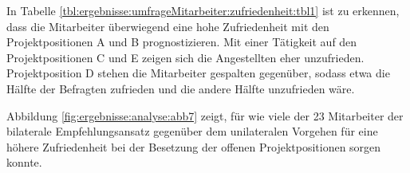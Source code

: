 In Tabelle \ref{tbl:ergebnisse:umfrageMitarbeiter:zufriedenheit:tbl1} ist zu erkennen, dass die Mitarbeiter überwiegend eine hohe Zufriedenheit mit den Projektpositionen A und B prognostizieren. Mit einer Tätigkeit auf den Projektpositionen C und E zeigen sich die Angestellten eher unzufrieden. Projektposition D stehen die Mitarbeiter gespalten gegenüber, sodass etwa die Hälfte der Befragten zufrieden und die andere Hälfte unzufrieden wäre.

Abbildung \ref{fig:ergebnisse:analyse:abb7} zeigt, für wie viele der 23 Mitarbeiter der bilaterale Empfehlungsansatz gegenüber dem unilateralen Vorgehen für eine höhere Zufriedenheit bei der Besetzung der offenen Projektpositionen sorgen konnte. 

\begin{figure}[h]
	\centering
	

\end{figure}

